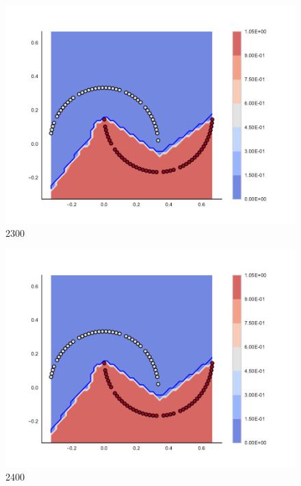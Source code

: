 \begin{subfigure}[b]{0.09\textwidth}
    \includegraphics[clip, trim=2.35cm 1.75cm 4.5cm 0cm,width=\textwidth]{img/convergence/2300.pdf}
    \caption{2300}
    \label{fig:convergence_2300}
\end{subfigure}
%
\begin{subfigure}[b]{0.09\textwidth}
    \includegraphics[clip, trim=2.35cm 1.75cm 4.5cm 0cm,width=\textwidth]{img/convergence/2400.pdf}
    \caption{2400}
    \label{fig:convergence_2400}
\end{subfigure}
%
